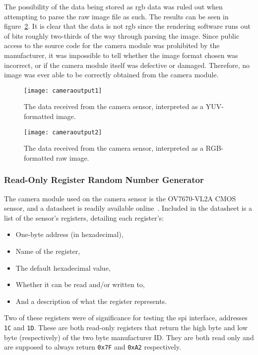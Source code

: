 The possibility of the data being stored as \acrfull{rgb} data was ruled out
when attempting to parse the raw image file as such. The results can be seen
in figure~\ref{fig:rgbimage}. It is clear that the data is not \acrshort{rgb}
since the rendering software runs out of bits roughly two-thirds of the way
through parsing the image. Since public access to the source code for the
camera module was prohibited by the manufacturer, it was impossible to tell
whether the image format chosen was incorrect, or if the camera module itself
was defective or damaged. Therefore, no image was ever able to be correctly
obtained from the camera module.

\begin{figure}[h]
  \centering
  \texttt{[image: cameraoutput1]}
  \caption{The data received from the camera sensor, interpreted as a
  YUV-formatted image.}
  \label{fig:yuvimage}
\end{figure}

\begin{figure}[h]
  \centering
  \texttt{[image: cameraoutput2]}
  \caption{The data received from the camera sensor, interpreted as a
  RGB-formatted raw image.}
  \label{fig:rgbimage}
\end{figure}

\subsubsection{Read-Only Register Random Number Generator}
The camera module used on the camera sensor is the OV7670-VL2A CMOS sensor,
and a datasheet is readily available online~\cite{omnivisiondatasheet}.
Included in the datasheet is a list of the sensor's registers, detailing each
register's:

\begin{itemize}
  \item One-byte address (in hexadecimal),
  \item Name of the register,
  \item The default hexadecimal value,
  \item Whether it can be read and/or written to,
  \item And a description of what the register represents.
\end{itemize}

Two of these registers were of significance for testing the \acrshort{spi}
interface, addresses \texttt{1C} and \texttt{1D}. These are both read-only
registers that return the high byte and low byte (respectively) of the two
byte manufacturer ID. They are both read only and are supposed to always
return \texttt{0x7F} and \texttt{0xA2} respectively.

